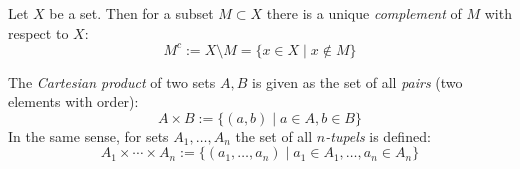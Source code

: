 \begin{Definition}
  Let $X$ be a set. Then for a
  subset $M \subset X$ there is a unique \emph{complement}
  of $M$ with respect to $X$:
  	$$
  	M^c := X \setminus M = \{ x \in X \mid x \notin M \}
  	$$
\end{Definition}

\begin{Definition}
 The \emph{Cartesian product} of two sets $A,B$ is
 given as the set of all \emph{pairs} (two elements with order):
 	$$
 		A \times B
 		:=  \{ (a,b) \mid a \in A, b \in B\}
 	$$
 In the same sense, for sets $A_1, \ldots, A_n$
 the set of all \emph{$n$-tupels} is defined:
  	$$
 		A_1 \times \cdots \times
 		A_n
 		:=  \{ (a_1,\ldots, a_n) \mid a_1 \in A_1, \ldots, a_n \in A_n\}
 	$$
\end{Definition}

